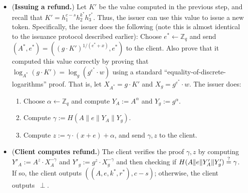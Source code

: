 \documentclass[11pt]{article}
\def\Z{{\mathbb Z}}
\def\Z{{\mathbb Z}}
\def\isequal{\stackrel{\rm ?}{=}}
\begin{document}
\begin{itemize}
\item ({\bf Issuing a refund.}) Let $K'$ be the value computed in the previous step, and recall that $K'=h_1^{c-s} h_2^{k^*} h_3^{r^*}$. Thus, the issuer can use this value to issue a new token.
Specifically, the issuer does the following (note this is almost identical to the issuance protocol described earlier):
Choose
$e^* \leftarrow \Z_q$ and send
$(A^*, e^*) = \left(\left(g \cdot K'\right)^{1/(e^*+x)}, e^*\right)$
to the client. 
Also prove that it computed this value correctly by proving that $\log_{A^*} \left(g \cdot K'\right) = \log_g \left(g^{e^*} \cdot w\right)$ using a standard ``equality-of-discrete-logarithms'' proof. 
That is, let $X_{A^*} = g \cdot K'$ and $X_g = g^{e^*} \cdot w$. The issuer does:
\begin{enumerate}
    \item Choose $\alpha \leftarrow \Z_q$ and compute $Y_A:= A^{\alpha}$ and $Y_g:=g^\alpha$.
    \item Compute $\gamma:=H(A\|e\|Y_A\|Y_g)$.
    \item Compute $z:=\gamma\cdot (x+e)+\alpha$, and send $\gamma, z$ to the client.
\end{enumerate}

\item ({\bf Client computes refund.}) The client verifies the proof $\gamma, z$ by computing $Y'_A:= A^z \cdot X_A^{-\gamma}$ and $Y'_g:=g^z \cdot X_g^{-\gamma}$ and then
checking if 
$H( A\|e\|Y'_A \| Y'_g ) \isequal \gamma$. If so, the client outputs $((A, e, k^*, r^*), c-s)$; otherwise, the client outputs~$\perp$.
\end{itemize}
\end{document}
